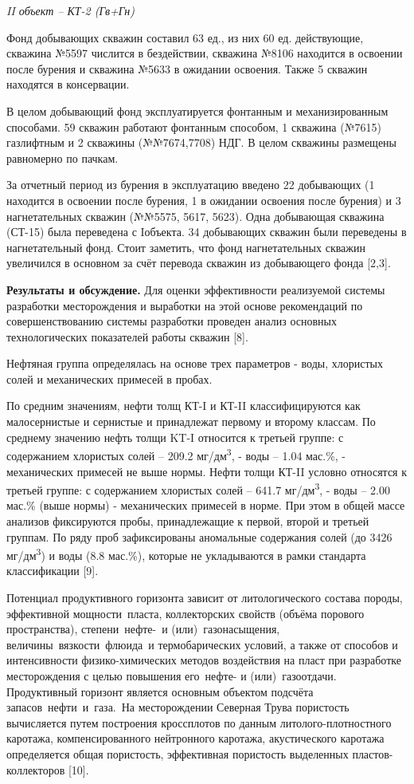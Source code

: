 \emph{II объект -- КТ-2 (Гв+Гн)}

Фонд добывающих скважин составил 63 ед., из них 60 ед. действующие,
скважина №5597 числится в бездействии, скважина №8106 находится в
освоении после бурения и скважина №5633 в ожидании освоения. Также 5
скважин находятся в консервации.

В целом добывающий фонд эксплуатируется фонтанным и механизированным
способами. 59 скважин работают фонтанным способом, 1 скважина (№7615)
газлифтным и 2 скважины (№№7674,7708) НДГ. В целом скважины размещены
равномерно по пачкам.

За отчетный период из бурения в эксплуатацию введено 22 добывающих (1
находится в освоении после бурения, 1 в ожидании освоения после бурения)
и 3 нагнетательных скважин (№№5575, 5617, 5623). Одна добывающая
скважина (СТ-15) была переведена с Iобъекта. 34 добывающих скважин были
переведены в нагнетательный фонд. Стоит заметить, что фонд
нагнетательных скважин увеличился в основном за счёт перевода скважин из
добывающего фонда {[}2,3{]}.

{\bfseries Результаты и обсуждение.} Для оценки эффективности реализуемой
системы разработки месторождения и выработки на этой основе рекомендаций
по совершенствованию системы разработки проведен анализ основных
технологических показателей работы скважин {[}8{]}.

Нефтяная группа определялась на основе трех параметров - воды, хлористых
солей и механических примесей в пробах.

По средним значениям, нефти толщ КТ-I и КТ-II классифицируются как
малосернистые и сернистые и принадлежат первому и второму классам. По
среднему значению нефть толщи KT-I относится к третьей группе: с
содержанием хлористых солей -- 209.2 мг/дм\textsuperscript{3}, - воды --
1.04 мас.\%, - механических примесей не выше нормы. Нефти толщи КТ-II
условно относятся к третьей группе: с содержанием хлористых солей --
641.7 мг/дм\textsuperscript{3}, - воды -- 2.00 мас.\% (выше нормы) -
механических примесей в норме. При этом в общей массе анализов
фиксируются пробы, принадлежащие к первой, второй и третьей группам. По
ряду проб зафиксированы аномальные содержания солей (до 3426
мг/дм\textsuperscript{3}) и воды (8.8 мас.\%), которые не укладываются в
рамки стандарта классификации {[}9{]}.

Потенциал продуктивного горизонта зависит от литологического состава
породы, эффективной мощности~пласта, коллекторских свойств (объёма
порового пространства), степени~нефте-~и (или)~газонасыщения,
величины~вязкости~флюида~и термобарических условий, а также от способов
и интенсивности физико-химических методов воздействия на пласт при
разработке месторождения с целью повышения его~нефте- и
(или)~газоотдачи. Продуктивный горизонт является основным объектом
подсчёта запасов~нефти~и~газа.~На месторождении Северная Трува
пористость вычисляется путем построения кроссплотов по данным
литолого-плотностного каротажа, компенсированного нейтронного каротажа,
акустического каротажа определяется общая пористость, эффективная
пористость выделенных пластов-коллекторов {[}10{]}.


